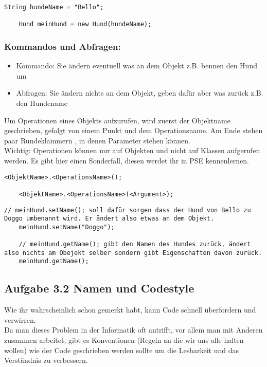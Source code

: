 \begin{lstlisting}[title=\textbf{Variable Beispiel}]
	String hundeName = "Bello";
	
	Hund meinHund = new Hund(hundeName);
\end{lstlisting}
\begin{Infobox}
	\subsubsection*{Kommandos und Abfragen:}
	\begin{itemize}
		\item Kommando: Sie ändern eventuell was an dem Objekt z.B. bennen den Hund um
		\item Abfragen: Sie ändern nichts an dem Objekt, geben dafür aber was zurück z.B. den Hundename
	\end{itemize}
	Um Operationen eines Objekts aufzurufen, wird zuerst der Objektname geschrieben, gefolgt von einem Punkt und dem Operationsname.
	Am Ende stehen paar Rundeklammern \q{()}, in denen Parameter stehen können.\\
	{\color{red} Wichtig: } Operationen können nur auf Objekten und nicht auf Klassen aufgerufen werden.
	Es gibt hier einen Sonderfall, diesen werdet ihr in PSE kennenlernen.
\end{Infobox}
\begin{lstlisting}[title=\textbf{Kommando/Abfrage Syntax}]
	<ObjektName>.<OperationsName>();
	
	<ObjektName>.<OperationsName>(<Argument>);
\end{lstlisting}

\begin{lstlisting}[title=\textbf{Kommando/Abfrage Beispiel}]
	// meinHund.setName(); soll dafür sorgen dass der Hund von Bello zu Doggo umbenannt wird. Er ändert also etwas an dem Objekt.
	meinHund.setName("Doggo");
	
	// meinHund.getName(); gibt den Namen des Hundes zurück, ändert also nichts am Obejekt selber sondern gibt Eigenschaften davon zurück.
	meinHund.getName();
\end{lstlisting}

\subsection*{Aufgabe 3.2 Namen und Codestyle}
Wie ihr wahrscheinlich schon gemerkt habt, kann Code schnell überfordern und verwirren.\\
Da man dieses Problem in der Informatik oft antrifft, vor allem man mit Anderen zusammen arbeitet, gibt es Konventionen (Regeln an die wir uns alle halten wollen) wie der Code geschrieben werden sollte um die Lesbarkeit und das Verständnis zu verbessern.

